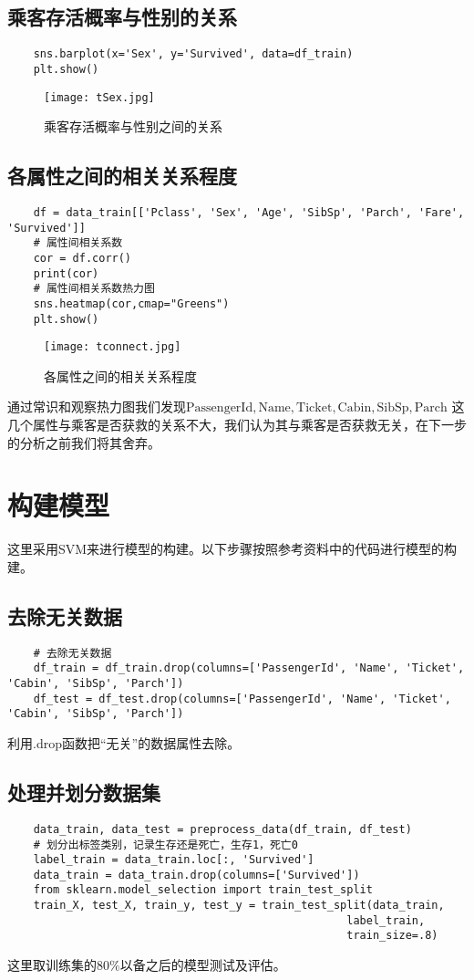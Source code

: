 \documentclass[AutoFakeBold]{LZUThesis}
\begin{document}
\section{乘客存活概率与性别的关系}
\begin{lstlisting}
    sns.barplot(x='Sex', y='Survived', data=df_train)
    plt.show()
\end{lstlisting}
\begin{figure}[htbp]
    \centering
    \texttt{[image: tSex.jpg]}
    \caption{乘客存活概率与性别之间的关系}
\end{figure}
\section{各属性之间的相关关系程度}
\begin{lstlisting}
    df = data_train[['Pclass', 'Sex', 'Age', 'SibSp', 'Parch', 'Fare', 'Survived']]
    # 属性间相关系数
    cor = df.corr()
    print(cor)
    # 属性间相关系数热力图
    sns.heatmap(cor,cmap="Greens")
    plt.show()
\end{lstlisting}
\begin{figure}[htbp]
    \centering
    \texttt{[image: tconnect.jpg]}
    \caption{各属性之间的相关关系程度}
\end{figure}
通过常识和观察热力图我们发现$\mathrm{PassengerId, Name, Ticket, Cabin, SibSp, Parch}$
这几个属性与乘客是否获救的关系不大，我们认为其与乘客是否获救无关，在下一步的分析之前我们将其舍弃。

\chapter{构建模型}
这里采用SVM来进行模型的构建。以下步骤按照参考资料中的代码进行模型的构建。
\section{去除无关数据}
\begin{lstlisting}
    # 去除无关数据
    df_train = df_train.drop(columns=['PassengerId', 'Name', 'Ticket', 'Cabin', 'SibSp', 'Parch'])
    df_test = df_test.drop(columns=['PassengerId', 'Name', 'Ticket', 'Cabin', 'SibSp', 'Parch'])
\end{lstlisting}
利用.drop函数把“无关”的数据属性去除。
\section{处理并划分数据集}
\begin{lstlisting}
    data_train, data_test = preprocess_data(df_train, df_test)
    # 划分出标签类别，记录生存还是死亡，生存1，死亡0
    label_train = data_train.loc[:, 'Survived']
    data_train = data_train.drop(columns=['Survived'])
    from sklearn.model_selection import train_test_split
    train_X, test_X, train_y, test_y = train_test_split(data_train,
                                                    label_train,
                                                    train_size=.8)
\end{lstlisting}
这里取训练集的$80\%$以备之后的模型测试及评估。
\end{document}
